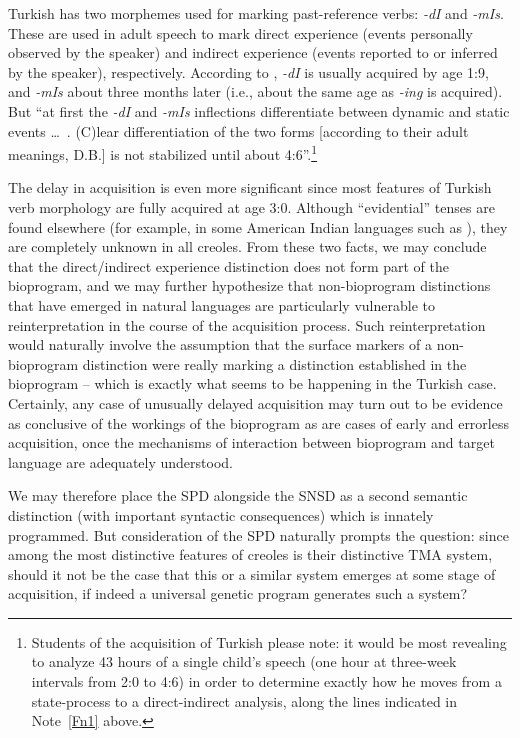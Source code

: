 Turkish has two morphemes used for marking past-reference verbs: \textit{-dI} and \textit{-mIs}. These are used in adult speech to mark direct experience (events personally observed by the speaker) and indirect experience (events reported to or inferred by the speaker), respectively. According to \citeauthor{SlobinEtAl1980}, \textit{-dI} is usually acquired by age 1:9, and \textit{-mIs} about three months later (i.e., about the same age as \textit{-ing} is acquired). But ``at first the \textit{-dI} and \textit{-mIs} inflections differentiate between dynamic and static events \ldots~. (C)lear differentiation of the two forms [according to their adult meanings, D.B.] is not stabilized until about 4:6''.\footnote{Students of the acquisition of Turkish please note: it would be most revealing to analyze 43 hours of a single child's speech (one hour at three-week intervals from 2:0 to 4:6) in order to determine exactly how he moves from a state-process to a direct-indirect analysis, along the lines indicated in Note~\ref{Fn1} above.}

The delay in acquisition is even more significant since most features of Turkish verb morphology are fully acquired at age 3:0. Although ``evidential'' tenses are found elsewhere (for example, in some American Indian languages such as ), they are completely un\-known in all creoles. From these two facts, we may conclude that the direct/indirect experience distinction does not form part of the bio\-program, and we may further hypothesize that non-bioprogram distinctions that have emerged in natural languages are particularly vulnerable to reinterpretation in the course of the acquisition process. Such reinterpretation would naturally involve the assumption that the surface markers of a non-bioprogram distinction were really marking a distinction established in the bioprogram -- which is exactly what seems to be happening in the Turkish case. Certainly, any case of unusually delayed acquisition may turn out to be evidence as conclusive
of the workings of the bioprogram as are cases of early and errorless acquisition, once the mechanisms of interaction between bioprogram and target language are adequately understood.

We may therefore place the SPD alongside the SNSD as a second semantic distinction (with important syntactic consequences) which is innately programmed. But consideration of the SPD naturally prompts the question: since among the most distinctive features of creoles is their distinctive TMA system, should it not be the case that this or a similar system emerges at some stage of acquisition, if indeed a uni\-versal genetic program generates such a system?

